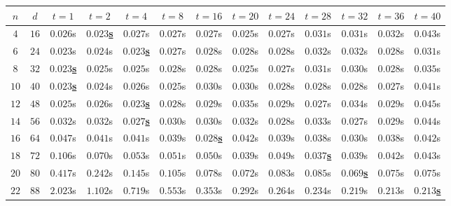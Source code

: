 \begin{table}
    \centering
    {\renewcommand{\arraystretch}{1.15}
        \setlength{\tabcolsep}{2.5pt}
        \begin{tabular}{ccccccccccccc}
            $n$ & $d$ & $t = 1$ & $t = 2$ & $t = 4$ & $t = 8$ & $t = 16$ & $t = 20$ & $t = 24$ & $t = 28$ & $t = 32$ & $t = 36$ & $t = 40$ \\
            \hline
            $4$ & $16$ & $0.026$s & \underline{$\mathbf{0.023}$\textbf{s}} & $0.027$s & $0.027$s & $0.027$s & $0.025$s & $0.027$s & $0.031$s & $0.031$s & $0.032$s & $0.043$s \\
            $6$ & $24$ & $0.023$s & $0.024$s & \underline{$\mathbf{0.023}$\textbf{s}} & $0.027$s & $0.028$s & $0.028$s & $0.028$s & $0.032$s & $0.032$s & $0.028$s & $0.031$s \\
            $8$ & $32$ & \underline{$\mathbf{0.023}$\textbf{s}} & $0.025$s & $0.025$s & $0.028$s & $0.028$s & $0.025$s & $0.027$s & $0.031$s & $0.030$s & $0.028$s & $0.035$s \\
            $10$ & $40$ & \underline{$\mathbf{0.023}$\textbf{s}} & $0.024$s & $0.026$s & $0.025$s & $0.030$s & $0.030$s & $0.028$s & $0.028$s & $0.028$s & $0.027$s & $0.041$s \\
            $12$ & $48$ & $0.025$s & $0.026$s & \underline{$\mathbf{0.023}$\textbf{s}} & $0.028$s & $0.029$s & $0.035$s & $0.029$s & $0.027$s & $0.034$s & $0.029$s & $0.045$s \\
            $14$ & $56$ & $0.032$s & $0.032$s & \underline{$\mathbf{0.027}$\textbf{s}} & $0.030$s & $0.030$s & $0.032$s & $0.028$s & $0.033$s & $0.027$s & $0.029$s & $0.044$s \\
            $16$ & $64$ & $0.047$s & $0.041$s & $0.041$s & $0.039$s & \underline{$\mathbf{0.028}$\textbf{s}} & $0.042$s & $0.039$s & $0.038$s & $0.030$s & $0.038$s & $0.042$s \\
            $18$ & $72$ & $0.106$s & $0.070$s & $0.053$s & $0.051$s & $0.050$s & $0.039$s & $0.049$s & \underline{$\mathbf{0.037}$\textbf{s}} & $0.039$s & $0.042$s & $0.043$s \\
            $20$ & $80$ & $0.417$s & $0.242$s & $0.145$s & $0.105$s & $0.078$s & $0.072$s & $0.083$s & $0.085$s & \underline{$\mathbf{0.069}$\textbf{s}} & $0.075$s & $0.075$s \\
            $22$ & $88$ & $2.023$s & $1.102$s & $0.719$s & $0.553$s & $0.353$s & $0.292$s & $0.264$s & $0.234$s & $0.219$s & $0.213$s & \underline{$\mathbf{0.213}$\textbf{s}} \\

\end{tabular}}
\end{table}
